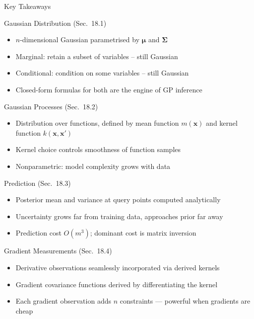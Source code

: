 \documentclass[aspectratio=169,10pt]{beamer}
\newcommand{\bx}{\mathbf{x}}
\newcommand{\bmu}{\boldsymbol{\mu}}
\newcommand{\bSigma}{\boldsymbol{\Sigma}}
\begin{document}
\begin{frame}[allowframebreaks]{Key Takeaways}
  \begin{block}{Gaussian Distribution (Sec.\ 18.1)}
    \begin{itemize}
      \item $n$-dimensional Gaussian parametrised by $\bmu$ and $\bSigma$
      \item Marginal: retain a subset of variables -- still Gaussian
      \item Conditional: condition on some variables -- still Gaussian
      \item Closed-form formulas for both are the engine of GP inference
    \end{itemize}
  \end{block}

  \begin{block}{Gaussian Processes (Sec.\ 18.2)}
    \begin{itemize}
      \item Distribution over functions, defined by mean function $m(\bx)$
            and kernel function $k(\bx,\bx')$
      \item Kernel choice controls smoothness of function samples
      \item Nonparametric: model complexity grows with data
    \end{itemize}
  \end{block}

  \begin{block}{Prediction (Sec.\ 18.3)}
    \begin{itemize}
      \item Posterior mean and variance at query points computed analytically
      \item Uncertainty grows far from training data, approaches prior far away
      \item Prediction cost $O(m^3)$; dominant cost is matrix inversion
    \end{itemize}
  \end{block}

  \framebreak

  \begin{block}{Gradient Measurements (Sec.\ 18.4)}
    \begin{itemize}
      \item Derivative observations seamlessly incorporated via derived kernels
      \item Gradient covariance functions derived by differentiating the kernel
      \item Each gradient observation adds $n$ constraints --- powerful when
            gradients are cheap
    \end{itemize}
  \end{block}


\end{frame}
\end{document}
